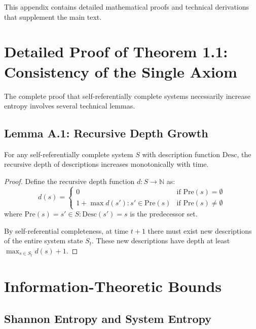 
This appendix contains detailed mathematical proofs and technical derivations that supplement the main text.

\section{Detailed Proof of Theorem 1.1: Consistency of the Single Axiom}

The complete proof that self-referentially complete systems necessarily increase entropy involves several technical lemmas.

\subsection{Lemma A.1: Recursive Depth Growth}

\begin{lemma}
For any self-referentially complete system $S$ with description function $\text{Desc}$, the recursive depth of descriptions increases monotonically with time.
\end{lemma}

\begin{proof}
Define the recursive depth function $d: S \to \mathbb{N}$ as:
\begin{equation}
d(s) = \begin{cases}
0 & \text{if } \text{Pre}(s) = \emptyset \\
1 + \max{d(s'): s' \in \text{Pre}(s)} & \text{if } \text{Pre}(s) \neq \emptyset
\end{cases}
\end{equation}
where $\text{Pre}(s) = {s' \in S: \text{Desc}(s') = s}$ is the predecessor set.

By self-referential completeness, at time $t+1$ there must exist new descriptions of the entire system state $S_t$. These new descriptions have depth at least $\max_{s \in S_t} d(s) + 1$.
\end{proof}

\section{Information-Theoretic Bounds}

\subsection{Shannon Entropy and System Entropy}

